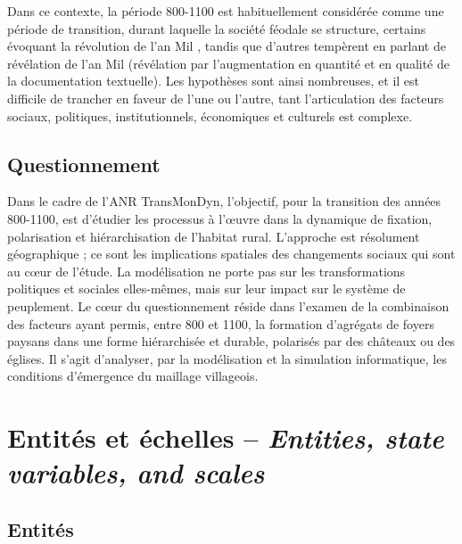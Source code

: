 {	Dans ce contexte, la période 800-1100 est habituellement considérée comme une période de transition, durant laquelle la société féodale se structure, certains évoquant la \og révolution de l'an Mil\fg{} \autocite{fossier_enfance_1982}, tandis que d'autres tempèrent en parlant de \og révélation de l'an Mil\fg{} \autocite{barthelemy_societe_1993} (\og révélation\fg{} par l'augmentation en quantité et en qualité de la documentation textuelle).
	Les hypothèses sont ainsi nombreuses, et il est difficile de trancher en faveur de l'une ou l'autre, tant l'articulation des facteurs sociaux, politiques, institutionnels, économiques et culturels est complexe.
}

\subsection{Questionnement}

{\redroman
	Dans le cadre de l'ANR TransMonDyn, l'objectif, pour la transition des années 800-1100, est d'étudier les processus à l'œuvre dans la dynamique de fixation, polarisation et hiérarchisation de l'habitat rural.
	L'approche est résolument géographique ; ce sont les implications spatiales des changements sociaux qui sont au cœur de l'étude.
	La modélisation ne porte pas sur les transformations politiques et sociales elles-mêmes, mais sur leur impact sur le système de peuplement.
	Le cœur du questionnement réside dans l'examen de la combinaison des facteurs ayant permis, entre 800 et 1100, la formation d'agrégats de foyers paysans dans une forme hiérarchisée et durable, polarisés par des châteaux ou des églises.
	Il s'agit d'analyser, par la modélisation et la simulation informatique, les conditions d'émergence du maillage villageois.
}

\let\orisectionmark\sectionmark
\renewcommand\sectionmark[1]{}%
\section[Entités et échelles -- \textit{Entities, state variables, and scales}]{Entités et échelles -- \large{\textit{Entities, state variables, and scales}}}
\orisectionmark{Entités et échelles}
\let\sectionmark\orisectionmark

\vspace{-.5em}
\subsection{Entités \label{subsec:entites}}

